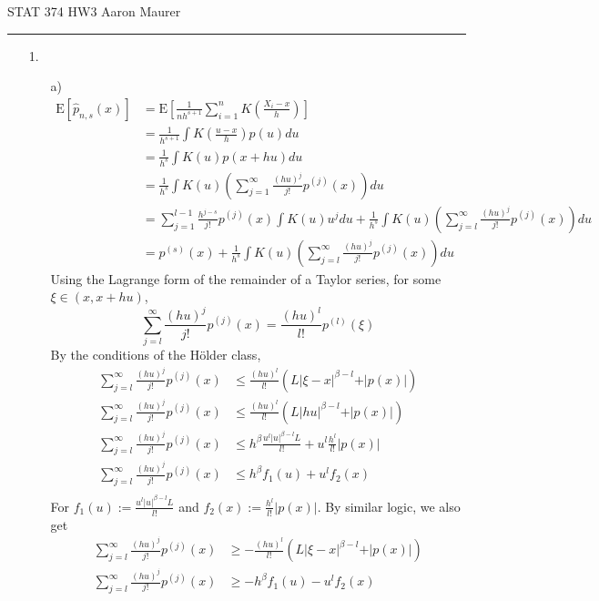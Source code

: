 \documentclass[11pt]{article}
\newcommand{\sumj}{\sum_{j=1}^\infty}
\newcommand{\E}{\mathrm{E}}
\theoremstyle{definition}
\begin{document}
STAT 374 HW3 \hfill Aaron Maurer
\vspace{2mm}
\hrule
\vspace{2mm}
\begin{itemize}
    \item[1.]
        \begin{itemize}
            \item[a)]
                \begin{align*}
                    \E[\hat p_{n,s}(x)] &= \E\left[\frac{1}{nh^{s+1}}\sum_{i=1}^n K\left(\frac{X_i-x}{h}\right)\right] \\
                                        &= \frac{1}{h^{s+1}}\int K\left(\frac{u-x}{h}\right)p(u) du\\
                                        &= \frac{1}{h^{s}}\int K\left(u\right)p(x+hu) du\\
                                        &= \frac{1}{h^{s}}\int K(u)\left(\sumj \frac{(hu)^j}{j!}p^{(j)}(x)\right) du\\
                                        &= \sum_{j=1}^{l-1}\frac{h^{j-s}}{j!}p^{(j)}(x)\int K(u)u^j du + \frac{1}{h^{s}}\int K(u)\left(\sum_{j=l}^\infty \frac{(hu)^j}{j!}p^{(j)}(x)\right) du\\
                                        &= p^{(s)}(x)+ \frac{1}{h^{s}}\int K(u)\left(\sum_{j=l}^\infty \frac{(hu)^j}{j!}p^{(j)}(x)\right) du
                \end{align*}
                Using the Lagrange form of the remainder of a Taylor series, for some $\xi\in(x,x+hu)$,
                \[\sum_{j=l}^\infty \frac{(hu)^j}{j!}p^{(j)}(x) = \frac{(hu)^l}{l!}p^{(l)}(\xi)\]
                By the conditions of the H{\"o}lder class,
                \begin{align*}
                    \sum_{j=l}^\infty \frac{(hu)^j}{j!}p^{(j)}(x) &\leq \frac{(hu)^l}{l!}(L\vert \xi - x\vert^{\beta-l} + \vert p(x)\vert) \\
                    \sum_{j=l}^\infty \frac{(hu)^j}{j!}p^{(j)}(x) &\leq \frac{(hu)^l}{l!}(L\vert hu\vert^{\beta-l}  + \vert p(x)\vert) \\
                    \sum_{j=l}^\infty \frac{(hu)^j}{j!}p^{(j)}(x) &\leq h^\beta\frac{u^l\vert u \vert^{\beta-l}L}{l!}+ u^l\frac{h^l}{l!}\vert p(x)\vert \\
                    \sum_{j=l}^\infty \frac{(hu)^j}{j!}p^{(j)}(x) &\leq h^\beta f_1(u)+ u^lf_2(x) \\
                \end{align*}
                For \(f_1(u):=\frac{u^l\vert u \vert^{\beta-l}L}{l!}\) and \(f_2(x):=\frac{h^l}{l!}\vert p(x)\vert\). By similar logic, we also get
                \begin{align*}
                    \sum_{j=l}^\infty \frac{(hu)^j}{j!}p^{(j)}(x) &\geq -\frac{(hu)^l}{l!}(L\vert \xi - x\vert^{\beta-l} + \vert p(x)\vert) \\
                    \sum_{j=l}^\infty \frac{(hu)^j}{j!}p^{(j)}(x) &\geq -h^\beta f_1(u)- u^lf_2(x) 
                \end{align*}


\end{itemize}
\end{itemize}
\end{document}
